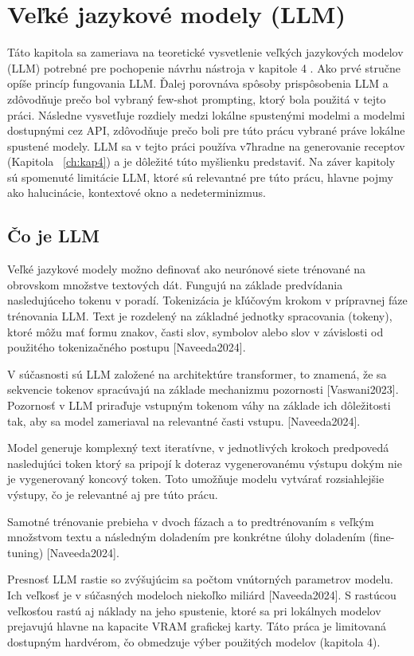 \chapter{Veľké jazykové modely (LLM)}
\label{ch:kap3}
Táto kapitola sa zameriava na teoretické vysvetlenie veľkých jazykových modelov (LLM) potrebné pre pochopenie návrhu nástroja v kapitole 4 . Ako prvé stručne opíše princíp fungovania LLM.  Ďalej porovnáva spôsoby prispôsobenia LLM a zdôvodňuje prečo bol vybraný few-shot prompting, ktorý bola použitá v tejto práci. Následne vysvetľuje rozdiely medzi lokálne spustenými modelmi a modelmi dostupnými cez API, zdôvodňuje prečo boli pre túto prácu vybrané práve lokálne spustené modely. LLM sa v tejto práci používa v7hradne na generovanie receptov (Kapitola ~\ref{ch:kap4}) a je dôležité túto myšlienku predstaviť. Na záver kapitoly sú spomenuté limitácie LLM, ktoré sú relevantné pre túto prácu, hlavne pojmy ako halucinácie, kontextové okno a nedeterminizmus. 

\section{Čo je LLM}

Veľké jazykové modely možno definovať ako neurónové siete trénované na obrovskom množstve textových dát. Fungujú na základe predvídania nasledujúceho tokenu v poradí. Tokenizácia je kľúčovým krokom v prípravnej fáze trénovania LLM. Text je rozdelený na základné jednotky spracovania (tokeny), ktoré môžu mať formu znakov, časti slov, symbolov alebo slov v závislosti od použitého tokenizačného postupu [Naveeda2024]. 

V súčasnosti sú LLM založené na architektúre transformer, to znamená, že sa sekvencie tokenov spracúvajú na základe mechanizmu pozornosti [Vaswani2023]. Pozornosť v LLM priraďuje vstupným tokenom váhy na základe ich dôležitosti tak, aby sa model zameriaval na relevantné časti vstupu. [Naveeda2024].

Model generuje komplexný text iteratívne, v jednotlivých krokoch predpovedá nasledujúci token ktorý sa pripojí k doteraz vygenerovanému výstupu dokým nie je vygenerovaný koncový token. Toto umožňuje modelu vytvárať rozsiahlejšie výstupy, čo je relevantné aj pre túto prácu.

Samotné trénovanie prebieha v dvoch fázach a to predtrénovaním s veľkým množstvom textu a následným doladením pre konkrétne úlohy doladením (fine-tuning) [Naveeda2024].

Presnosť LLM rastie so zvýšujúcim sa počtom vnútorných parametrov modelu. Ich veľkosť je v súčasných modeloch niekoľko miliárd [Naveeda2024]. S rastúcou veľkosťou rastú aj náklady na jeho spustenie, ktoré sa pri lokálnych modelov prejavujú hlavne na kapacite VRAM grafickej karty. Táto práca je limitovaná dostupným hardvérom, čo obmedzuje výber použitých modelov (kapitola 4).

